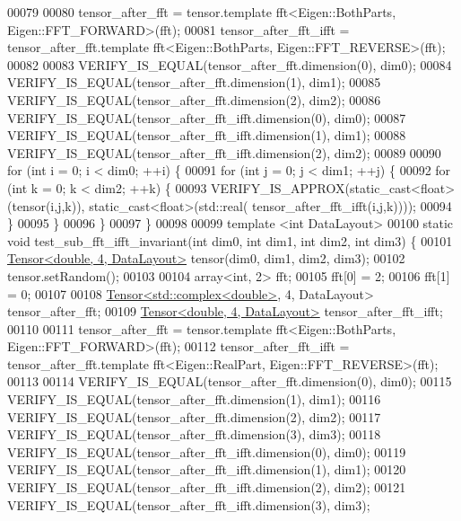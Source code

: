 \begin{DoxyCode}
00079 
00080   tensor\_after\_fft = tensor.template fft<Eigen::BothParts, Eigen::FFT\_FORWARD>(fft);
00081   tensor\_after\_fft\_ifft = tensor\_after\_fft.template fft<Eigen::BothParts, Eigen::FFT\_REVERSE>(fft);
00082 
00083   VERIFY\_IS\_EQUAL(tensor\_after\_fft.dimension(0), dim0);
00084   VERIFY\_IS\_EQUAL(tensor\_after\_fft.dimension(1), dim1);
00085   VERIFY\_IS\_EQUAL(tensor\_after\_fft.dimension(2), dim2);
00086   VERIFY\_IS\_EQUAL(tensor\_after\_fft\_ifft.dimension(0), dim0);
00087   VERIFY\_IS\_EQUAL(tensor\_after\_fft\_ifft.dimension(1), dim1);
00088   VERIFY\_IS\_EQUAL(tensor\_after\_fft\_ifft.dimension(2), dim2);
00089 
00090   \textcolor{keywordflow}{for} (\textcolor{keywordtype}{int} i = 0; i < dim0; ++i) \{
00091     \textcolor{keywordflow}{for} (\textcolor{keywordtype}{int} j = 0; j < dim1; ++j) \{
00092       \textcolor{keywordflow}{for} (\textcolor{keywordtype}{int} k = 0; k < dim2; ++k) \{
00093         VERIFY\_IS\_APPROX(static\_cast<float>(tensor(i,j,k)), static\_cast<float>(std::real(
      tensor\_after\_fft\_ifft(i,j,k))));
00094       \}
00095     \}
00096   \}
00097 \}
00098 
00099 \textcolor{keyword}{template} <\textcolor{keywordtype}{int} DataLayout>
00100 \textcolor{keyword}{static} \textcolor{keywordtype}{void} test\_sub\_fft\_ifft\_invariant(\textcolor{keywordtype}{int} dim0, \textcolor{keywordtype}{int} dim1, \textcolor{keywordtype}{int} dim2, \textcolor{keywordtype}{int} dim3) \{
00101   \hyperlink{class_eigen_1_1_tensor}{Tensor<double, 4, DataLayout>} tensor(dim0, dim1, dim2, dim3);
00102   tensor.setRandom();
00103 
00104   array<int, 2> fft;
00105   fft[0] = 2;
00106   fft[1] = 0;
00107 
00108   \hyperlink{class_eigen_1_1_tensor}{Tensor<std::complex<double>}, 4, DataLayout> tensor\_after\_fft;
00109   \hyperlink{class_eigen_1_1_tensor}{Tensor<double, 4, DataLayout>} tensor\_after\_fft\_ifft;
00110 
00111   tensor\_after\_fft = tensor.template fft<Eigen::BothParts, Eigen::FFT\_FORWARD>(fft);
00112   tensor\_after\_fft\_ifft = tensor\_after\_fft.template fft<Eigen::RealPart, Eigen::FFT\_REVERSE>(fft);
00113 
00114   VERIFY\_IS\_EQUAL(tensor\_after\_fft.dimension(0), dim0);
00115   VERIFY\_IS\_EQUAL(tensor\_after\_fft.dimension(1), dim1);
00116   VERIFY\_IS\_EQUAL(tensor\_after\_fft.dimension(2), dim2);
00117   VERIFY\_IS\_EQUAL(tensor\_after\_fft.dimension(3), dim3);
00118   VERIFY\_IS\_EQUAL(tensor\_after\_fft\_ifft.dimension(0), dim0);
00119   VERIFY\_IS\_EQUAL(tensor\_after\_fft\_ifft.dimension(1), dim1);
00120   VERIFY\_IS\_EQUAL(tensor\_after\_fft\_ifft.dimension(2), dim2);
00121   VERIFY\_IS\_EQUAL(tensor\_after\_fft\_ifft.dimension(3), dim3);

\end{DoxyCode}
